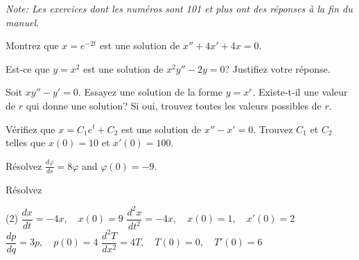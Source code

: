 \noindent
\emph{Note: Les exercices dont les num\'eros sont 101 et plus ont des r\'eponses \`a la fin du manuel.}


\setcounter{exercise}{100}

\begin{exercise}
Montrez que $x = e^{-2t}$ est une solution de $x'' + 4x' + 4x = 0$.
\end{exercise}

\begin{exercise}
Est-ce que $y = x^2$ est une solution de $x^2y'' - 2y = 0$?  Justifiez votre r\'eponse.
\end{exercise}

\begin{exercise}
Soit $xy'' - y' = 0$.  Essayez une solution de la forme $y = x^r$.  Existe-t-il une valeur de $r$ qui donne une solution?  Si oui, trouvez toutes les valeurs possibles de $r$.
\end{exercise}


\begin{exercise}
V\'erifiez que $x=C_1e^t+C_2$ est une solution de $x''-x' = 0$.  Trouvez $C_1$ et 
$C_2$ telles que $x(0) = 10$ et $x'(0) = 100$.
\end{exercise}

\begin{exercise}
R\'esolvez $\frac{d\varphi}{ds} = 8 \varphi$ and $\varphi(0) = -9$.
\end{exercise}

\begin{exercise}
R\'esolvez
\begin{tasks}(2)
\task $\dfrac{dx}{dt} = -4x, \quad x(0)=9$
\task $\dfrac{d^2x}{dt^2} = -4x, \quad x(0)=1, \quad x'(0)=2$
\task $\dfrac{dp}{dq} = 3 p, \quad p(0)=4$
\task $\dfrac{d^2T}{dx^2} = 4 T, \quad T(0)=0, \quad T'(0)=6$
\end{tasks}
\end{exercise}


